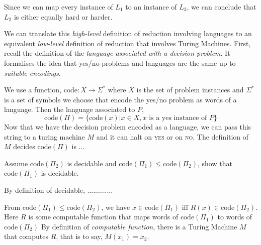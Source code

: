 Since we can map every instance of $L_1$ to an instance of $L_2$, 
we can conclude that $L_2$ is either equally hard or harder.



\frmrule

We can translate this \textit{high-level} definition of reduction
involving languages to an equivalent 
\textit{low-level} definition of reduction that involves 
Turing Machines. First, recall the definition of the 
\textit{language associated with a decision problem}. It formalises the idea 
that yes/no problems and languages are the same up to \textit{suitable encodings}. 

We use a function, $\text{code}:X \rightarrow \Sigma^{*}$ where $X$ is the set of
problem instances and $\Sigma^{*}$ is a set of symbols we choose that encode 
the yes/no problem as words of a language. Then the language associated to $P$, 
$$\text{code}(\Pi) = \{\text{code}(x) | x \in X, x \text{ is a yes instance of } P\}$$
Now that we have the decision problem encoded as a language, we can pass this 
string to a turing machine $M$ and it can halt on \textsc{yes} or 
on \textsc{no}.
The definition of $M$ decides $\text{code}(\Pi)$ is ...


\begin{example}
Assume $\text{code}(\Pi_2)$ is decidable 
and $\text{code}(\Pi_1) \leqslant \text{code}(\Pi_2)$, show that $\text{code}(\Pi_1)$ is decidable.
\end{example}

By definition of decidable, .............


From $\text{code}(\Pi_1) \leqslant \text{code}(\Pi_2)$, we have
$x \in \text{code}(\Pi_1) \text{ iff } R(x) \in \text{code}(\Pi_2)$. \\ 
Here $R$ is some computable function
that maps words of $\text{code}(\Pi_1)$ to words of $\text{code}(\Pi_2)$
By definition of \textit{computable function}, there is a Turing Machine $M$ 
that computes $R$, that is to say, $M(x_1) = x_2$. 

